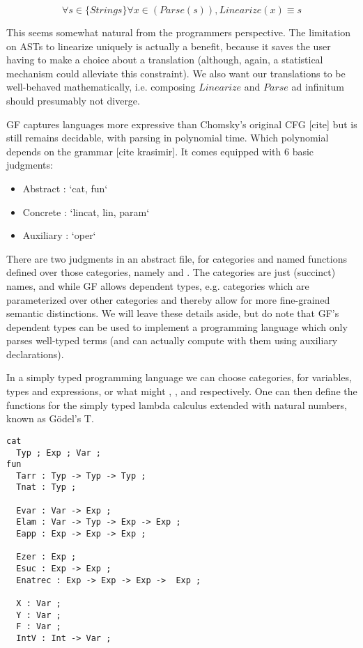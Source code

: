 $$\forall s \in \{Strings\} \forall x \in (Parse(s)), Linearize(x) \equiv s$$

This seems somewhat natural from the programmers perspective. The limitation on
ASTs to linearize uniquely is actually a benefit, because it saves the user
having to make a choice about a translation (although, again, a statistical
mechanism could alleviate this constraint). We also want our translations to be
well-behaved mathematically, i.e. composing $Linearize$ and $Parse$ ad
infinitum should presumably not diverge.

GF captures languages more expressive than Chomsky's original 
CFG [cite] but is still remains decidable, with parsing in polynomial
time. Which polynomial depends on the grammar [cite krasimir]. 
It comes equipped with 6 basic judgments:

\begin{itemize}[noitemsep]
  \item Abstract : `cat, fun`
  \item Concrete : `lincat, lin, param`
  \item Auxiliary : `oper`
\end{itemize}

There are two judgments in an abstract file, for categories and named functions
defined over those categories, namely  and . The categories
are just (succinct) names, and while GF allows dependent types, e.g. categories
which are parameterized over other categories and thereby allow for more
fine-grained semantic distinctions. We will leave these details aside, but do
note that GF's dependent types can be used to implement a programming language
which only parses well-typed terms (and can actually compute with them using
auxiliary declarations).

In a simply typed programming language we can choose categories, for
variables, types and expressions, or what might , , and
 respectively. One can then define the functions for the simply typed
lambda calculus extended with natural numbers, known as Gödel's T.

\begin{verbatim} 
cat
  Typ ; Exp ; Var ;
fun
  Tarr : Typ -> Typ -> Typ ;
  Tnat : Typ ;

  Evar : Var -> Exp ;
  Elam : Var -> Typ -> Exp -> Exp ;
  Eapp : Exp -> Exp -> Exp ;

  Ezer : Exp ;
  Esuc : Exp -> Exp ;
  Enatrec : Exp -> Exp -> Exp ->  Exp ;

  X : Var ;
  Y : Var ;
  F : Var ;
  IntV : Int -> Var ;
\end{verbatim}

